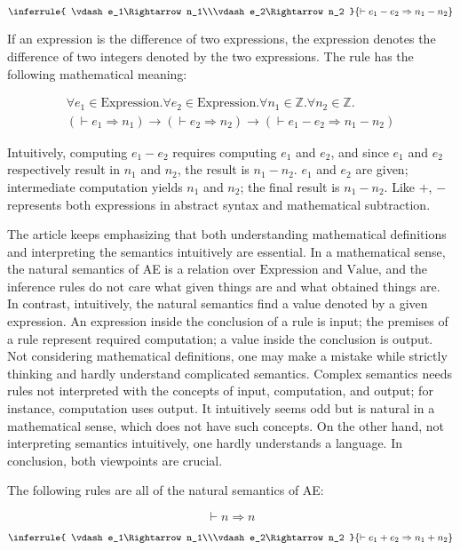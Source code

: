 \[
\inferrule
{ \vdash e_1\Rightarrow n_1\\\vdash e_2\Rightarrow n_2 }
{ \vdash e_1-e_2\Rightarrow n_1-n_2 }
\]

If an expression is the difference of two expressions, the expression denotes
the difference of two integers denoted by the two expressions. The rule has
the following mathematical meaning:

\[
\begin{array}{l}
\forall e_1\in\text{Expression}.
\forall e_2\in\text{Expression}.
\forall n_1\in\mathbb{Z}.
\forall n_2\in\mathbb{Z}.\\
(\vdash e_1\Rightarrow n_1)\rightarrow
(\vdash e_2\Rightarrow n_2)\rightarrow
(\vdash e_1-e_2\Rightarrow n_1-n_2)
\end{array}
\]

Intuitively, computing \(e_1-e_2\) requires computing \(e_1\) and \(e_2\), and
since \(e_1\) and \(e_2\) respectively result in \(n_1\) and \(n_2\), the
result is \(n_1-n_2\). \(e_1\) and \(e_2\) are given; intermediate computation
yields \(n_1\) and \(n_2\); the final result is \(n_1-n_2\).
Like \(+\), \(-\) represents both expressions in abstract syntax and
mathematical subtraction.

The article keeps emphasizing that both understanding mathematical definitions
and interpreting the semantics intuitively are essential. In a mathematical
sense, the natural semantics of AE is a relation over \(\text{Expression}\)
and \(\text{Value}\), and the inference rules do not care what given things
are and what obtained things are. In contrast, intuitively, the natural
semantics find a value denoted by a given expression. An expression inside the
conclusion of a rule is input; the premises of a rule represent required
computation; a value inside the conclusion is output. Not considering
mathematical definitions, one may make a mistake while strictly thinking and
hardly understand complicated semantics. Complex semantics needs rules not
interpreted with the concepts of input, computation, and output; for instance,
computation uses output. It intuitively seems odd but is natural in a
mathematical sense, which does not have such concepts. On the other hand, not
interpreting semantics intuitively, one hardly understands a language. In
conclusion, both viewpoints are crucial.

The following rules are all of the natural semantics of AE:

\[
\vdash n\Rightarrow n
\]

\[
\inferrule
{ \vdash e_1\Rightarrow n_1\\\vdash e_2\Rightarrow n_2 }
{ \vdash e_1+e_2\Rightarrow n_1+n_2 }
\]

